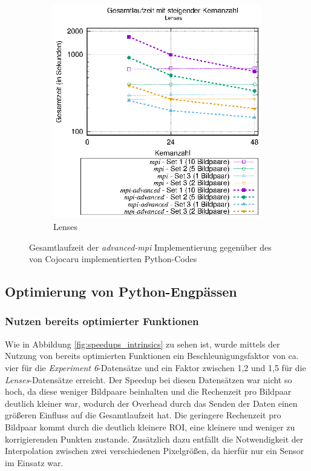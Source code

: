 \begin{center}
\begin{figure}[htbp]
\begin{subfigure}[b]{0.45\textwidth}
			\includegraphics[width=\textwidth]{pdf/mpi_advanced_times_lenses}
			\caption{Lenses}
			\label{fig:mpi_advanced_times_lenses}
		\end{subfigure}
		\caption{Gesamtlaufzeit der \textit{advanced-mpi} Implementierung gegenüber des von Cojocaru implementierten Python-Codes}
		\label{fig:mpi_advanced_times}
	\end{figure}
\end{center}

\subsection{Optimierung von Python-Engpässen}

\subsubsection{Nutzen bereits optimierter Funktionen}

Wie in Abbildung \ref{fig:speedups_intrinsics} zu sehen ist, wurde mittels der Nutzung von bereits optimierten Funktionen ein Beschleunigungsfaktor von ca. vier für die \textit{Experiment 6}-Datensätze und ein Faktor zwischen 1,2 und 1,5 für die \textit{Lenses}-Datensätze erreicht. Der Speedup bei diesen Datensätzen war nicht so hoch, da diese weniger Bildpaare beinhalten und die Rechenzeit pro Bildpaar deutlich kleiner war, wodurch der Overhead durch das Senden der Daten einen größeren Einfluss auf die Gesamtlaufzeit hat. Die geringere Rechenzeit pro Bildpaar kommt durch die deutlich kleinere \gls{ROI}, eine kleinere   und weniger zu korrigierenden Punkten zustande. Zusätzlich dazu entfällt die Notwendigkeit der Interpolation zwischen zwei verschiedenen Pixelgrößen, da hierfür nur ein Sensor im Einsatz war.

